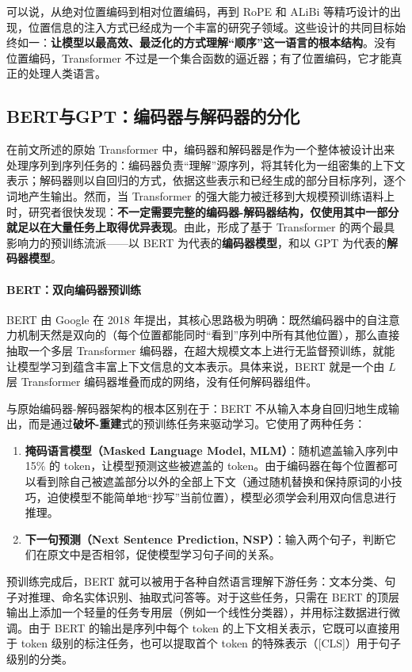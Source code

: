 可以说，从绝对位置编码到相对位置编码，再到 RoPE 和 ALiBi 等精巧设计的出现，位置信息的注入方式已经成为一个丰富的研究子领域。这些设计的共同目标始终如一：\textbf{让模型以最高效、最泛化的方式理解“顺序”这一语言的根本结构}。没有位置编码，Transformer 不过是一个集合函数的逼近器；有了位置编码，它才能真正的处理人类语言。

\subsection{BERT与GPT：编码器与解码器的分化}

在前文所述的原始 Transformer 中，编码器和解码器是作为一个整体被设计出来处理序列到序列任务的：编码器负责“理解”源序列，将其转化为一组密集的上下文表示；解码器则以自回归的方式，依据这些表示和已经生成的部分目标序列，逐个词地产生输出。然而，当 Transformer 的强大能力被迁移到大规模预训练语料上时，研究者很快发现：\textbf{不一定需要完整的编码器-解码器结构，仅使用其中一部分就足以在大量任务上取得优异表现}。由此，形成了基于 Transformer 的两个最具影响力的预训练流派——以 BERT 为代表的\textbf{编码器模型}，和以 GPT 为代表的\textbf{解码器模型}。

\paragraph{BERT：双向编码器预训练}

BERT\cite{devlin2019bertpretrainingdeepbidirectional} 由 Google 在 2018 年提出，其核心思路极为明确：既然编码器中的自注意力机制天然是双向的（每个位置都能同时“看到”序列中所有其他位置），那么直接抽取一个多层 Transformer 编码器，在超大规模文本上进行无监督预训练，就能让模型学习到蕴含丰富上下文信息的文本表示。具体来说，BERT 就是一个由 $L$ 层 Transformer 编码器堆叠而成的网络，没有任何解码器组件。

与原始编码器-解码器架构的根本区别在于：BERT 不从输入本身自回归地生成输出，而是通过\textbf{破坏-重建}式的预训练任务来驱动学习。它使用了两种任务：
\begin{enumerate}
    \item \textbf{掩码语言模型（Masked Language Model, MLM）}：随机遮盖输入序列中 15\% 的 token，让模型预测这些被遮盖的 token。由于编码器在每个位置都可以看到除自己被遮盖部分以外的全部上下文（通过随机替换和保持原词的小技巧，迫使模型不能简单地“抄写”当前位置），模型必须学会利用双向信息进行推理。
    \item \textbf{下一句预测（Next Sentence Prediction, NSP）}：输入两个句子，判断它们在原文中是否相邻，促使模型学习句子间的关系。
\end{enumerate}
预训练完成后，BERT 就可以被用于各种自然语言理解下游任务：文本分类、句子对推理、命名实体识别、抽取式问答等。对于这些任务，只需在 BERT 的顶层输出上添加一个轻量的任务专用层（例如一个线性分类器），并用标注数据进行微调。由于 BERT 的输出是序列中每个 token 的上下文相关表示，它既可以直接用于 token 级别的标注任务，也可以提取首个 token 的特殊表示（[CLS]）用于句子级别的分类。

